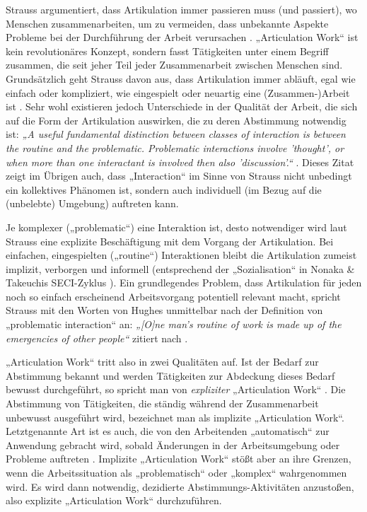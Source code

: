 Strauss argumentiert, dass Artikulation immer passieren muss (und passiert), wo Menschen zusammenarbeiten, um zu vermeiden, dass unbekannte Aspekte Probleme bei der Durchführung der Arbeit verursachen \citep{Strauss88}. „Articulation Work“ ist kein revolutionäres Konzept, sondern fasst Tätigkeiten unter einem Begriff zusammen, die seit jeher Teil jeder Zusammenarbeit zwischen Menschen sind. Grundsätzlich geht Strauss davon aus, dass Artikulation immer abläuft, egal wie einfach oder kompliziert, wie eingespielt oder neuartig eine (Zusammen-)Arbeit ist \citep{Strauss88}. Sehr wohl existieren jedoch Unterschiede in der Qualität der Arbeit, die sich auf die Form der Artikulation auswirken, die zu deren Abstimmung notwendig ist: \emph{„A useful fundamental distinction between classes of interaction is between the routine and the problematic. Problematic interactions involve 'thought', or when more than one interactant is involved then also 'discussion'.“} \citep{Strauss93}. Dieses Zitat zeigt im Übrigen auch, dass „Interaction“ im Sinne von Strauss nicht unbedingt ein kollektives Phänomen ist, sondern auch individuell (im Bezug auf die (unbelebte) Umgebung) auftreten kann.

Je komplexer („problematic“) eine Interaktion ist, desto notwendiger wird laut Strauss eine explizite Beschäftigung mit dem Vorgang der Artikulation. Bei einfachen, eingespielten („routine“) Interaktionen bleibt die Artikulation zumeist implizit, verborgen und informell \citep{Hampson05} (entsprechend der „Sozialisation“ in Nonaka \& Takeuchis SECI-Zyklus \citep{Nonaka95}). Ein grundlegendes Problem, dass Artikulation für jeden noch so einfach erscheinend Arbeitsvorgang potentiell relevant macht, spricht Strauss mit den Worten von Hughes unmittelbar nach der Definition von „problematic interaction“ an: \emph{„[O]ne man's routine of work is made up of the emergencies of other people“} \citep{Hughes71} zitiert nach \citep{Strauss93}.

„Articulation Work“ tritt also in zwei Qualitäten auf. Ist der Bedarf zur Abstimmung bekannt und werden Tätigkeiten zur Abdeckung dieses Bedarf bewusst durchgeführt, so spricht man von \emph{expliziter} „Articulation Work“ \citep{Strauss88}\citep{Fjuk97}. Die Abstimmung von Tätigkeiten, die ständig während der Zusammenarbeit unbewusst ausgeführt wird, bezeichnet man als implizite „Articulation Work“. Letztgenannte Art ist es auch, die von den Arbeitenden „automatisch“ zur Anwendung gebracht wird, sobald Änderungen in der Arbeitsumgebung oder Probleme auftreten \citep{Strauss88}. Implizite „Articulation Work“ stößt aber an ihre Grenzen, wenn die Arbeitssituation als „problematisch“ \citep{Strauss88} oder „komplex“ \citep[][S. 23f]{Schmidt90} wahrgenommen wird. Es wird dann notwendig, dezidierte Abstimmungs-Aktivitäten anzustoßen, also explizite „Articulation Work“ durchzuführen.

